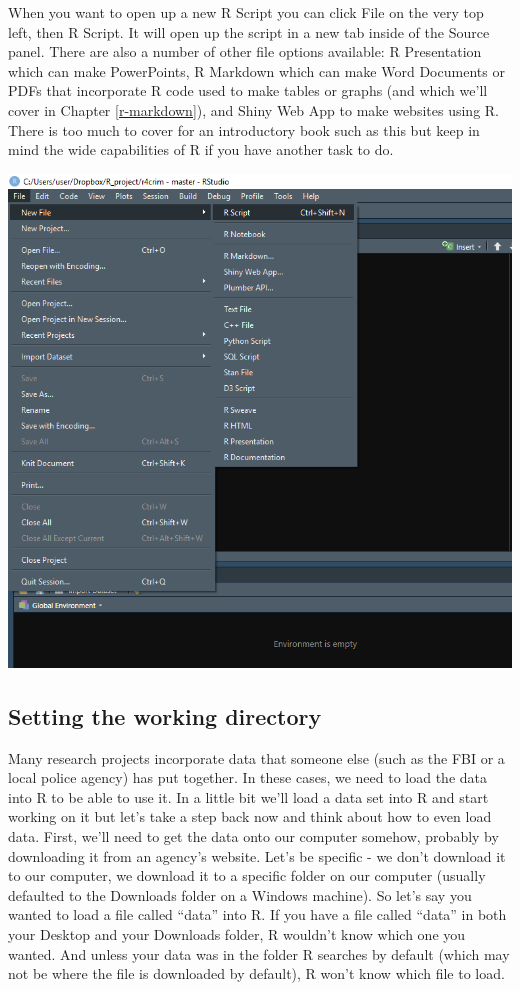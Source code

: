 \documentclass[
  12pt,
  openany]{book}
\begin{document}
When you want to open up a new R Script you can click File on the very top left, then R Script. It will open up the script in a new tab inside of the Source panel. There are also a number of other file options available: R Presentation which can make PowerPoints, R Markdown which can make Word Documents or PDFs that incorporate R code used to make tables or graphs (and which we'll cover in Chapter \ref{r-markdown}), and Shiny Web App to make websites using R. There is too much to cover for an introductory book such as this but keep in mind the wide capabilities of R if you have another task to do.

\includegraphics{images/rstudio_2.PNG}

\hypertarget{setting-the-working-directory}{%
\subsection{Setting the working directory}\label{setting-the-working-directory}}

Many research projects incorporate data that someone else (such as the FBI or a local police agency) has put together. In these cases, we need to load the data into R to be able to use it. In a little bit we'll load a data set into R and start working on it but let's take a step back now and think about how to even load data. First, we'll need to get the data onto our computer somehow, probably by downloading it from an agency's website. Let's be specific - we don't download it to our computer, we download it to a specific folder on our computer (usually defaulted to the Downloads folder on a Windows machine). So let's say you wanted to load a file called ``data'' into R. If you have a file called ``data'' in both your Desktop and your Downloads folder, R wouldn't know which one you wanted. And unless your data was in the folder R searches by default (which may not be where the file is downloaded by default), R won't know which file to load.
\end{document}
